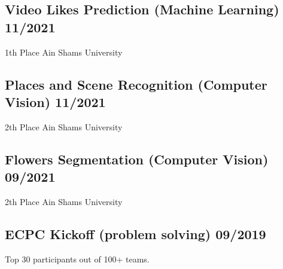 \documentclass[letter,10pt]{article}
\begin{document}
\subsection{{Video Likes Prediction (Machine Learning)} \hfill 11/2021}

\begin{zitemize}
\item 1th Place Ain Shams University
\end{zitemize}


\subsection{{Places and Scene Recognition (Computer Vision)}  \hfill 11/2021}

\begin{zitemize}
\item 2th Place Ain Shams University
\end{zitemize}




\subsection{{Flowers Segmentation (Computer Vision)}  \hfill 09/2021}

\begin{zitemize}
\item 2th Place Ain Shams University
\end{zitemize}



\subsection{{ECPC Kickoﬀ (problem solving)} \hfill 09/2019}

\begin{zitemize}
\item Top 30 participants out of 100+ teams.
\end{zitemize}


\end{document}
